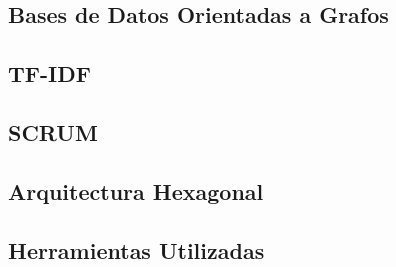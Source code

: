 \subsection{Bases de Datos Orientadas a Grafos}
\label{Chapter01-section3:Bases de datos orientadas a grados}


\subsection{TF-IDF}
\label{Chapter01-section3:TD-IDF}


\subsection{SCRUM}
\label{Chapter01-section3:SCRUM}



\subsection{Arquitectura Hexagonal}
\label{Chapter01-section3:Arquitectura Hexagonal}


\subsection{Herramientas Utilizadas}
\label{Chapter01-section3:Herramientas utilizadas}
